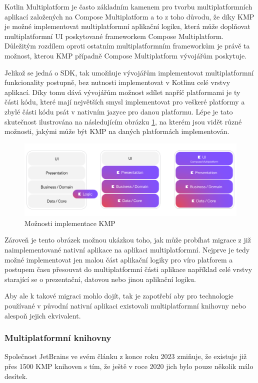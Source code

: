 Kotlin Multiplatform je často základním kamenem pro tvorbu multiplatformních aplikací založených na Compose Multiplatform a to
z toho důvodu, že díky KMP je možné implementovat multiplatformní aplikační logiku, která může doplňovat multiplatformní UI 
poskytované frameworkem Compose Multiplatform. \cite{KMPUseCases} Důležitým rozdílem oproti ostatním multiplatformním frameworkům 
je právě ta možnost, kterou KMP případně Compose Multiplatform vývojářům poskytuje. 

Jelikož se jedná o SDK, tak umožňuje vývojářům implementovat multiplatformní funkcionality postupně, bez nutnosti implementovat 
v Kotlinu celé vrstvy aplikací. Díky tomu dává vývojářům možnost sdílet napříč platformami je ty části kódu, které mají největších
smysl implementovat pro veškeré platformy a zbylé části kódu psát v nativním jazyce pro danou platformu. \cite{KMP}
Lépe je tato skutečnost ilustrována na následujícím obrázku \ref{fig:KMP_vrstvy}, na kterém jsou vidět různé možnosti,
jakými může být KMP na daných platformách implementován.

\begin{figure}[H]
  \centering
  \includegraphics[width=1\textwidth]{KMP_vrstvy.png}
  \caption{Možnosti implementace KMP}
  \label{fig:KMP_vrstvy}
\end{figure}

Zároveň je tento obrázek možnou ukázkou toho, jak může probíhat migrace z již naimplementované nativní aplikace na aplikaci
multiplatformní. Nejprve je tedy možné implementovat jen malou část aplikační logiky pro víro platforem a postupem času přesouvat
do multiplatformní části aplikace například celé vrstvy starající se o prezentační, datovou nebo jinou aplikační logiku. \cite{KMPUseCases}

Aby ale k takové migraci mohlo dojít, tak je zapotřebí aby pro technologie používané v původní nativní aplikaci existovali multiplatformní
knihovny nebo alespoň jejich ekvivalent.

\subsubsection*{Multiplatformní knihovny}
Společnost JetBrains ve svém článku z konce roku 2023 zmiňuje, že existuje již přes 1500 KMP knihoven s tím, že ještě v roce 2020
jich bylo pouze několik málo desítek. \cite{KMPstable}

